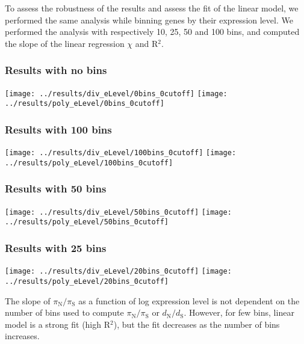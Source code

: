 \documentclass[10pt]{article}
\newcommand{\dn}{d_{\text{N}}}
\newcommand{\ds}{d_{\text{S}}}
\newcommand{\dnds}{\dn / \ds}
\newcommand{\pin}{\pi_{\text{N}}}
\newcommand{\pis}{\pi_{\text{S}}}
\newcommand{\pinpis}{\pin / \pis}
\begin{document}
    To assess the robustness of the results and assess the fit of the linear model, we performed the same analysis while binning genes by their expression level.
    We performed the analysis with respectively 10, 25, 50 and 100 bins, and computed the slope of the linear regression $\chi$ and R$^2$.

    \subsubsection{Results with no bins}
    \begin{center}
        \texttt{[image: ../results/div\_eLevel/0bins\_0cutoff]}
        \texttt{[image: ../results/poly\_eLevel/0bins\_0cutoff]}
    \end{center}

    \subsubsection{Results with 100 bins}
    \begin{center}
        \texttt{[image: ../results/div\_eLevel/100bins\_0cutoff]}
        \texttt{[image: ../results/poly\_eLevel/100bins\_0cutoff]}
    \end{center}

    \subsubsection{Results with 50 bins}
    \begin{center}
        \texttt{[image: ../results/div\_eLevel/50bins\_0cutoff]}
        \texttt{[image: ../results/poly\_eLevel/50bins\_0cutoff]}
    \end{center}

    \subsubsection{Results with 25 bins}
    \begin{center}
        \texttt{[image: ../results/div\_eLevel/20bins\_0cutoff]}
        \texttt{[image: ../results/poly\_eLevel/20bins\_0cutoff]}
    \end{center}

    The slope of $\pinpis$ as a function of log expression level is not dependent on the number of bins used to compute $\pinpis$ or $\dnds$.
    However, for few bins, linear model is a strong fit (high R$^2$), but the fit decreases as the number of bins increases.
\end{document}
